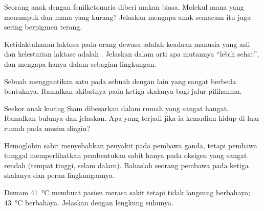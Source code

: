 \begin{exercise}[$\star\star$]\label{exo:g11:enzymes-and-phenotype:8}
Seorang anak dengan fenilketonuria diberi makan biasa. Molekul mana
yang menumpuk dan mana yang kurang? Jelaskan mengapa anak semacam itu
juga sering berpigmen terang.
\end{exercise}

\begin{exercise}[$\star\star$]\label{exo:g11:enzymes-and-phenotype:9}
Ketidaktahanan laktosa pada orang dewasa adalah keadaan manusia yang
asli dan kelestarian laktase adalah . Jelaskan dalam arti apa
 mutannya ``lebih sehat'', dan mengapa hanya dalam sebagian
lingkungan.
\end{exercise}

\begin{exercise}[$\star\star$]\label{exo:g11:enzymes-and-phenotype:10}
Sebuah  menggantikan satu  pada  sebuah
 dengan  lain yang sangat berbeda bentuknya. Ramalkan
akibatnya pada ketiga skalanya bagi jalur pilihanmu.
\end{exercise}

\begin{exercise}[$\star\star$]\label{exo:g11:enzymes-and-phenotype:11}
Seekor anak kucing Siam dibesarkan dalam rumah yang sangat hangat.
Ramalkan bulunya dan jelaskan. Apa yang terjadi jika ia kemudian hidup
di luar rumah pada musim dingin?
\end{exercise}

\begin{exercise}[$\star\star\star$]\label{exo:g11:enzymes-and-phenotype:12}
Hemoglobin  sabit menyebabkan penyakit pada pembawa ganda, tetapi
pembawa tunggal memperlihatkan pembentukan sabit hanya pada oksigen
yang sangat rendah (tempat tinggi, selam dalam). Bahaslah 
seorang pembawa pada ketiga skalanya dan peran lingkungannya.
\end{exercise}

\begin{exercise}[$\star\star\star$]\label{exo:g11:enzymes-and-phenotype:13}
Demam \qty{41}{\celsius} membuat pasien merasa sakit tetapi tidak
langsung berbahaya; \qty{43}{\celsius} berbahaya. Jelaskan dengan
lengkung suhunya.
\end{exercise}

